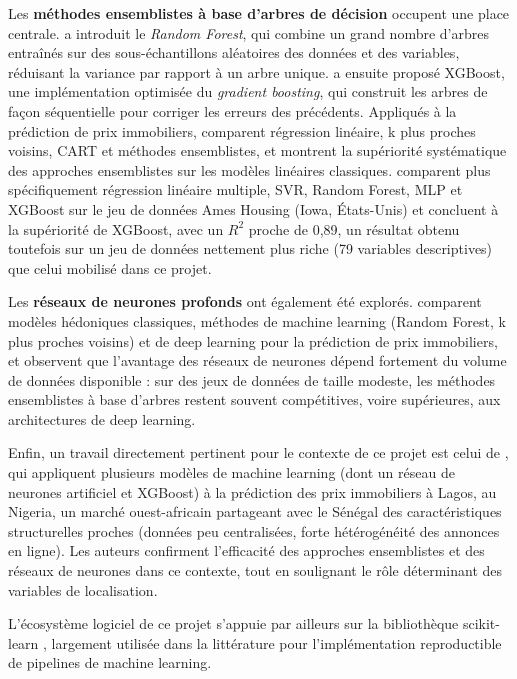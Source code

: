 Les \textbf{méthodes ensemblistes à base d'arbres de décision} occupent une place centrale.
\citet{breiman2001randomforests} a introduit le \emph{Random Forest}, qui combine un grand
nombre d'arbres entraînés sur des sous-échantillons aléatoires des données et des variables,
réduisant la variance par rapport à un arbre unique. \citet{chen2016xgboost} a ensuite proposé
XGBoost, une implémentation optimisée du \emph{gradient boosting}, qui construit les arbres de
façon séquentielle pour corriger les erreurs des précédents. Appliqués à la prédiction de prix
immobiliers, \citet{truong2020housing} comparent régression linéaire, k plus proches voisins,
CART et méthodes ensemblistes, et montrent la supériorité systématique des approches
ensemblistes sur les modèles linéaires classiques. \citet{sharma2024optimal} comparent plus
spécifiquement régression linéaire multiple, SVR, Random Forest, MLP et XGBoost sur le jeu de
données Ames Housing (Iowa, États-Unis) et concluent à la supériorité de XGBoost, avec un
$R^2$ proche de 0,89, un résultat obtenu toutefois sur un jeu de données nettement plus riche
(79 variables descriptives) que celui mobilisé dans ce projet.

Les \textbf{réseaux de neurones profonds} ont également été explorés. \citet{yazdani2021mldl}
comparent modèles hédoniques classiques, méthodes de machine learning (Random Forest, k plus
proches voisins) et de deep learning pour la prédiction de prix immobiliers, et observent que
l'avantage des réseaux de neurones dépend fortement du volume de données disponible : sur des
jeux de données de taille modeste, les méthodes ensemblistes à base d'arbres restent souvent
compétitives, voire supérieures, aux architectures de deep learning.

Enfin, un travail directement pertinent pour le contexte de ce projet est celui de
\citet{nwankwo2023lagos}, qui appliquent plusieurs modèles de machine learning (dont un réseau
de neurones artificiel et XGBoost) à la prédiction des prix immobiliers à Lagos, au Nigeria, un
marché ouest-africain partageant avec le Sénégal des caractéristiques structurelles proches
(données peu centralisées, forte hétérogénéité des annonces en ligne). Les auteurs confirment
l'efficacité des approches ensemblistes et des réseaux de neurones dans ce contexte, tout en
soulignant le rôle déterminant des variables de localisation.

L'écosystème logiciel de ce projet s'appuie par ailleurs sur la bibliothèque scikit-learn
\citep{pedregosa2011scikitlearn}, largement utilisée dans la littérature pour l'implémentation
reproductible de pipelines de machine learning.

